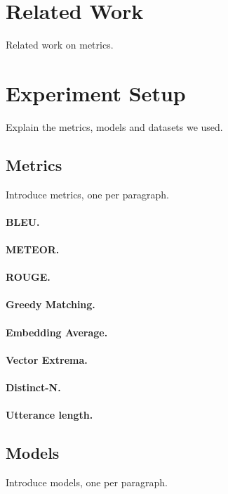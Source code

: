 \documentclass[runningheads]{llncs}
\begin{document}
    \section{Related Work}
    Related work on metrics.

    \section{Experiment Setup}
    Explain the metrics, models and datasets we used.

    \subsection{Metrics}
    Introduce metrics, one per paragraph.
    \paragraph{BLEU.}
    \paragraph{METEOR.}
    \paragraph{ROUGE.}

    \paragraph{Greedy Matching.}
    \paragraph{Embedding Average.}
    \paragraph{Vector Extrema.}

    \paragraph{Distinct-N.}
    \paragraph{Utterance length.}

    \subsection{Models}
    Introduce models, one per paragraph.
\end{document}

